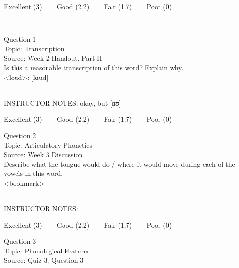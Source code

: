 \documentclass[12pt]{article}
\begin{document}
\vfill
Excellent (3) ~~~ Good (2.2) ~~~ Fair (1.7) ~~~ Poor (0)
\newpage

\begin{center}
\textbf{{\color{red}{\HUGE END OF EXAM}}}\\

\end{center}
\newpage

\begin{center}
\textbf{{\color{blue}{\HUGE START OF EXAM\\}}}

\textbf{{\color{blue}{\HUGE Student ID: 43803\\}}}

\textbf{{\color{blue}{\HUGE \\}}}

\end{center}
\newpage

{\large Question 1}\\

Topic: Transcription\\
Source: Week 2 Handout, Part II\\

Is this a reasonable transcription of this word? Explain why.\\

<loud>: {[lɑud]}


~\\
INSTRUCTOR NOTES: okay, but [ɑʊ]


\vfill
Excellent (3) ~~~ Good (2.2) ~~~ Fair (1.7) ~~~ Poor (0)
\newpage

{\large Question 2}\\

Topic: Articulatory Phonetics\\
Source: Week 3 Discussion\\

Describe what the tongue would do / where it would move during each of the vowels in this word.\\

<bookmark>


~\\
INSTRUCTOR NOTES: 


\vfill
Excellent (3) ~~~ Good (2.2) ~~~ Fair (1.7) ~~~ Poor (0)
\newpage

{\large Question 3}\\

Topic: Phonological Features\\
Source: Quiz 3, Question 3\\
\end{document}
